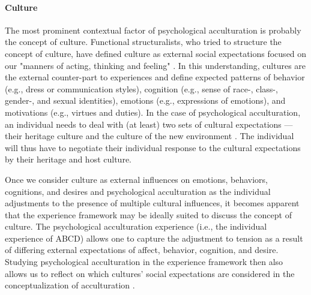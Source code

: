 \documentclass[man, 12pt, a4paper]{apa7}
\begin{document}
\paragraph{Culture}
The most prominent contextual factor of psychological acculturation is probably the concept of culture. Functional structuralists, who tried to structure the concept of culture, have defined culture as external social expectations focused on our "manners of acting, thinking and feeling" \citep[][p. 52; on social facts]{Durkheim1982}. In this understanding, cultures are the external counter-part to experiences and define expected patterns of behavior (e.g., dress or communication styles), cognition (e.g., sense of race-, class-, gender-, and sexual identities), emotions (e.g., expressions of emotions), and motivations (e.g., virtues and duties). In the case of psychological acculturation, an individual needs to deal with (at least) two sets of cultural expectations --- their heritage culture and the culture of the new environment \citep[e.g., see models of][]{Berry1997b, Berry2006a}. The individual will thus have to negotiate their individual response to the cultural expectations by their heritage and host culture.

Once we consider culture as external influences on emotions, behaviors, cognitions, and desires and psychological acculturation as the individual adjustments to the presence of multiple cultural influences, it becomes apparent that the experience framework may be ideally suited to discuss the concept of culture. The psychological acculturation experience (i.e., the individual experience of ABCD) allows one to capture the adjustment to tension as a result of differing external expectations of affect, behavior, cognition, and desire. Studying psychological acculturation in the experience framework then also allows us to reflect on which cultures' social expectations are considered in the conceptualization of acculturation \citep{Bhatia2001}. 
\end{document}
